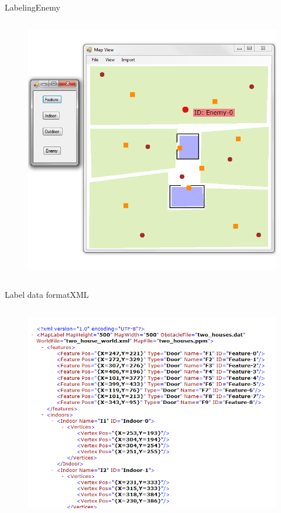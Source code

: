 \begin{frame}{Labeling}{Enemy}

\begin{columns}
\begin{figure}
\centering
\includegraphics[width = \textwidth]{./screenshot/enemy_label.png}
\end{figure}

\begin{minipage}{\textwidth}
\end{minipage}
\end{columns}

\end{frame}

\begin{frame}{Label data format}{XML}

\begin{columns}
\begin{figure}
\centering
\includegraphics[width = \textwidth]{./screenshot/label_data_xml.png}
\end{figure}

\begin{minipage}{\textwidth}
\end{minipage}
\end{columns}

\end{frame}